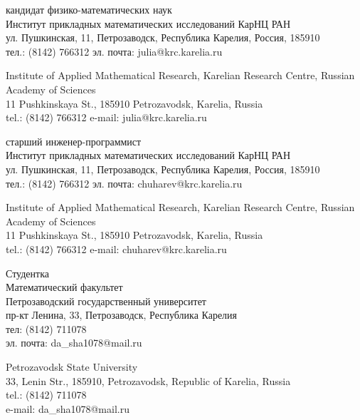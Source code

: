 \documentclass{article}
\begin{document}
\begin{aboutauthors}
кандидат физико-математических наук\\ 
Институт прикладных математических исследований КарНЦ РАН\\ 
ул. Пушкинская, 11, Петрозаводск, Республика Карелия, Россия, 185910\\
тел.: (8142) 766312
эл. почта: julia@krc.karelia.ru

\columnbreak

Institute of Applied Mathematical Research, Karelian Research Centre, Russian Academy of Sciences\\
11 Pushkinskaya St., 185910 Petrozavodsk, Karelia, Russia\\
tel.: (8142) 766312
e-mail: julia@krc.karelia.ru
\end{aboutauthors}

\begin{aboutauthors}
старший инженер-программист\\ 
Институт прикладных математических исследований КарНЦ РАН\\ 
ул. Пушкинская, 11, Петрозаводск, Республика Карелия, Россия, 185910\\
тел.: (8142) 766312
эл. почта: chuharev@krc.karelia.ru

\columnbreak

Institute of Applied Mathematical Research, Karelian Research Centre, Russian Academy of Sciences\\
11 Pushkinskaya St., 185910 Petrozavodsk, Karelia, Russia\\
tel.: (8142) 766312
e-mail: chuharev@krc.karelia.ru
\end{aboutauthors}

\begin{aboutauthors}
Студентка\\ 
Математический факультет\\ 
Петрозаводский государственный университет\\
пр-кт Ленина, 33, Петрозаводск, Республика Карелия\\
тел: (8142) 711078\\
эл. почта: da\_sha1078@mail.ru

\columnbreak

Petrozavodsk State University\\
33, Lenin Str., 185910, Petrozavodsk, Republic of Karelia, Russia\\
tel.: (8142) 711078\\
e-mail: da\_sha1078@mail.ru
\end{aboutauthors}
\end{document}
